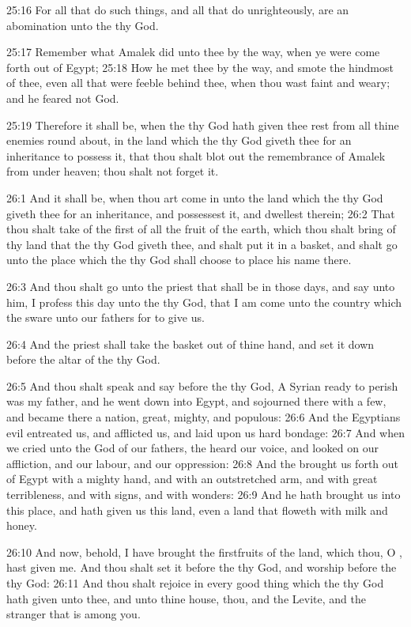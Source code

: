 25:16 For all that do such things, and all that do unrighteously, are an abomination unto the \LORD thy God.

25:17 Remember what Amalek did unto thee by the way, when ye were come forth out of Egypt; 25:18 How he met thee by the way, and smote the hindmost of thee, even all that were feeble behind thee, when thou wast faint and weary; and he feared not God.

25:19 Therefore it shall be, when the \LORD thy God hath given thee rest from all thine enemies round about, in the land which the \LORD thy God giveth thee for an inheritance to possess it, that thou shalt blot out the remembrance of Amalek from under heaven; thou shalt not forget it.

26:1 And it shall be, when thou art come in unto the land which the \LORD thy God giveth thee for an inheritance, and possessest it, and dwellest therein; 26:2 That thou shalt take of the first of all the fruit of the earth, which thou shalt bring of thy land that the \LORD thy God giveth thee, and shalt put it in a basket, and shalt go unto the place which the \LORD thy God shall choose to place his name there.

26:3 And thou shalt go unto the priest that shall be in those days, and say unto him, I profess this day unto the \LORD thy God, that I am come unto the country which the \LORD sware unto our fathers for to give us.

26:4 And the priest shall take the basket out of thine hand, and set it down before the altar of the \LORD thy God.

26:5 And thou shalt speak and say before the \LORD thy God, A Syrian ready to perish was my father, and he went down into Egypt, and sojourned there with a few, and became there a nation, great, mighty, and populous: 26:6 And the Egyptians evil entreated us, and afflicted us, and laid upon us hard bondage: 26:7 And when we cried unto the \LORD God of our fathers, the \LORD heard our voice, and looked on our affliction, and our labour, and our oppression: 26:8 And the \LORD brought us forth out of Egypt with a mighty hand, and with an outstretched arm, and with great terribleness, and with signs, and with wonders: 26:9 And he hath brought us into this place, and hath given us this land, even a land that floweth with milk and honey.

26:10 And now, behold, I have brought the firstfruits of the land, which thou, O \LORD, hast given me. And thou shalt set it before the \LORD thy God, and worship before the \LORD thy God: 26:11 And thou shalt rejoice in every good thing which the \LORD thy God hath given unto thee, and unto thine house, thou, and the Levite, and the stranger that is among you.

